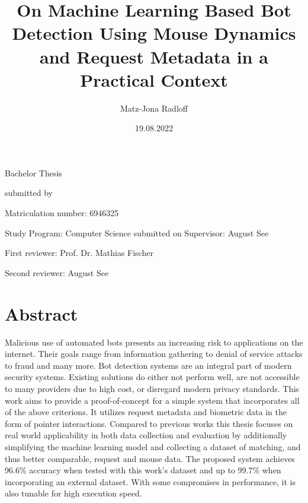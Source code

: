 \documentclass[
    fontsize=12pt,
    headings=small,
    parskip=half,           %
    bibliography=totoc,
    numbers=noenddot,       %
    open=any,               %
    final,                   %
    table
]{scrreprt}
\begin{document}
\title{On Machine Learning Based Bot Detection Using Mouse Dynamics and Request Metadata in a Practical Context}
\author{Matz-Jona Radloff}
\date{19.08.2022} %


\begin{titlepage}
\begin{center}\Large
    \vfill
    Bachelor Thesis
    \vfill
    \makeatletter
    {\Large\textsf{\textbf{\@title}}\par}
    \makeatother
    \vfill
    submitted by
    \par\bigskip
    \makeatletter
    {\@author} \par
    \makeatother
    Matriculation number: 6946325 \par
    Study Program: Computer Science
    \vfill
    \makeatletter
    submitted on {\@date}
    \makeatother
    \vfill
    Supervisor: August See\par
    First reviewer: Prof. Dr. Mathias Fischer \par
    Second reviewer: August See
\end{center}
\end{titlepage}


\chapter*{Abstract}

Malicious use of automated bots presents an increasing risk to applications on the internet. Their goals range from information gathering to denial of service attacks to fraud and many more. Bot detection systems are an integral part of modern security systems. Existing solutions do either not perform well, are not accessible to many providers due to high cost, or disregard modern privacy  standards. This work aims to provide a proof-of-concept for a simple system that incorporates all of the above criterions. It utilizes request metadata and biometric data in the form of pointer interactions. Compared to previous works this thesis focuses on real world applicability in both data collection and evaluation by additionally simplifying the machine learning model and collecting a dataset of matching, and thus better comparable, request and mouse data. The proposed system achieves 96.6\% accuracy when tested with this work's dataset and up to 99.7\% when incorporating an external dataset. With some compromises in performance, it is also tunable for high execution speed.
\end{document}
